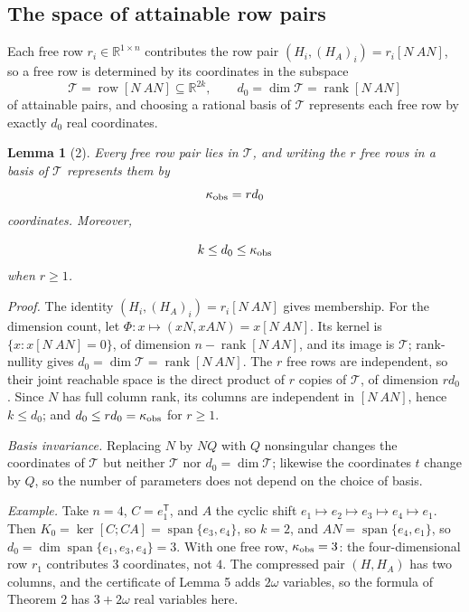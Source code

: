 \documentclass[journal]{IEEEtran}
\theoremstyle{plainn}
\newtheorem*{lem}{Lemma}
\begin{document}
\subsection{The space of attainable row pairs}\label{sec:free}
Each free row $r_i\in\mathbb R^{1\times n}$ contributes the row pair
$(H_i,(H_A)_i)=r_i[N\ AN]$, so a free row is determined by its coordinates in the subspace
\begin{equation}
\mathcal T=\operatorname{row}[N\ AN]\subseteq\mathbb R^{2k},\qquad
d_0=\dim\mathcal T=\operatorname{rank}[N\ AN]
\end{equation}
of attainable pairs, and choosing a rational basis of $\mathcal T$ represents each free
row by exactly $d_0$ real coordinates.
\begin{lem}[2] Every free row pair lies in $\mathcal T$, and writing the $r$ free rows in
a basis of $\mathcal T$ represents them by
\begin{equation}
\label{eq:kappa}
\kappa_{\rm obs}=r d_0
\end{equation}
coordinates. Moreover,

\begin{equation}
k\le d_0\le\kappa_{\rm obs}
\end{equation}
when $r\ge1$.

\end{lem}
\emph{Proof.} The identity $(H_i,(H_A)_i)=r_i[N\ AN]$ gives membership. For the dimension count,
let $\Phi:x\mapsto(xN,xAN)=x[N\ AN]$. Its kernel is $\{x:x[N\ AN]=0\}$, of dimension
$n-\operatorname{rank}[N\ AN]$, and its image is $\mathcal T$; rank-nullity gives
$d_0=\dim\mathcal T=\operatorname{rank}[N\ AN]$. The $r$ free rows are independent, so their joint
reachable space is the direct product of $r$ copies of $\mathcal T$, of dimension $rd_0$. Since $N$ has full column rank, its columns are independent in $[N\ AN]$, hence $k\le d_0$; and $d_0\le rd_0=\kappa_{\rm obs}$ for $r\ge1$.

\emph{Basis invariance.} Replacing $N$ by $NQ$ with $Q$ nonsingular changes the coordinates of $\mathcal T$ but neither $\mathcal T$ nor $d_0=\dim\mathcal T$; likewise the coordinates $t$ change by $Q$, so the number of parameters does not depend on the choice of basis.

\emph{Example.} Take $n=4$, $C=e_1^{\mathsf T}$, and $A$ the cyclic shift $e_1\mapsto e_2\mapsto e_3\mapsto e_4\mapsto e_1$. Then $K_0=\ker[C;CA]=\operatorname{span}\{e_3,e_4\}$, so $k=2$, and $AN=\operatorname{span}\{e_4,e_1\}$, so $d_0=\dim\operatorname{span}\{e_1,e_3,e_4\}=3$. With one free row, $\kappa_{\rm obs}=3$: the four-dimensional row $r_1$ contributes $3$ coordinates, not $4$. The compressed pair $(H,H_A)$ has two columns, and the certificate of Lemma 5 adds $2\omega$ variables, so the formula of Theorem 2 has $3+2\omega$ real variables here.
\end{document}

